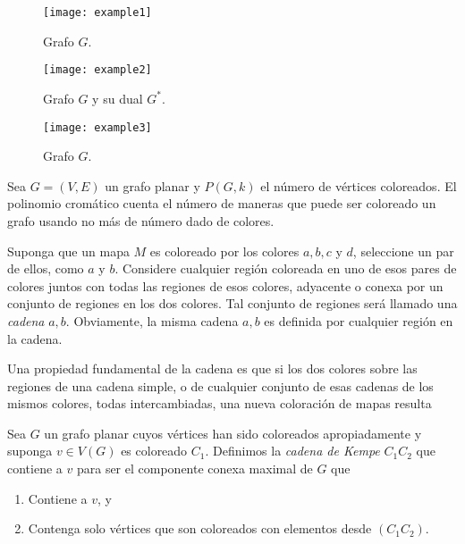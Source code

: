 \documentclass[3p,times,a4paper,twocolumn,authoryear]{elsarticle} %
\begin{document}
\begin{figure}[H]
\centering
\texttt{[image: example1]}
\caption{Grafo $G$.}
\end{figure}

\begin{figure}[H]
	\centering
	\texttt{[image: example2]}
	\caption{Grafo $G$ y su dual $G^{\ast}$.}
\end{figure}

\begin{figure}[H]
	\centering
	\texttt{[image: example3]}
	\caption{Grafo $G$.}
\end{figure}

\begin{definition}

Sea $G=(V,E)$ un grafo planar y $P(G,k)$ el número de vértices coloreados.
El polinomio cromático cuenta el número de maneras que puede ser coloreado un grafo usando no más de número dado de colores.

\end{definition}

\begin{definition}

Suponga que un mapa $M$ es coloreado por los colores $a, b, c$ y $d$, seleccione un par de ellos, como $a$ y $b$. Considere cualquier región coloreada en uno de esos pares de colores juntos con todas las regiones de esos colores, adyacente o conexa por un conjunto de regiones en los dos colores. Tal conjunto de regiones será llamado una \emph{cadena} $a,b$. Obviamente, la misma cadena $a,b$ es definida por cualquier región en la cadena.

Una propiedad fundamental de la cadena es que si los dos colores sobre las regiones de una cadena simple, o de cualquier conjunto de esas cadenas de los mismos colores, todas intercambiadas, una nueva coloración de mapas resulta

\end{definition}

\begin{definition}

Sea $G$ un grafo planar cuyos vértices han sido coloreados apropiadamente y suponga $v\in V(G)$ es coloreado $C_1$. Definimos la \emph{cadena de Kempe} $C_1C_2$ que contiene a $v$ para ser el componente conexa maximal de $G$ que

\begin{enumerate}%

	\item Contiene a $v$, y
	
	\item Contenga solo vértices que son coloreados con elementos desde $(C_1C_2)$.

\end{enumerate}

\end{definition}
\end{document}
